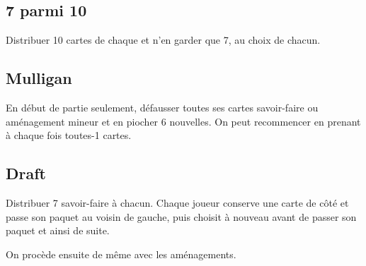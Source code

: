 \documentclass[10pt, a4paper]{article}	%
\begin{document}
\begin{multicols}{3}
\subsection*{7 parmi 10}
Distribuer 10 cartes de chaque et n'en garder que 7, au choix de chacun.

\subsection*{Mulligan}
En début de partie seulement, défausser toutes ses cartes savoir-faire ou aménagement mineur et en piocher 6 nouvelles. On peut recommencer en prenant à chaque fois toutes-1 cartes.

\subsection*{Draft}
Distribuer 7 savoir-faire à chacun. Chaque joueur conserve une carte de côté et passe son paquet au voisin de gauche, puis choisit à nouveau avant de passer son paquet et ainsi de suite.

On procède ensuite de même avec les aménagements.







\end{multicols}
\end{document}
